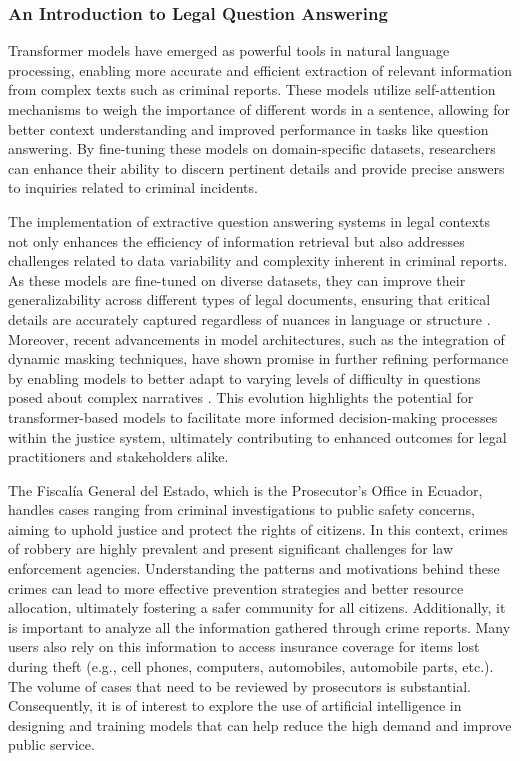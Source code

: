 \documentclass[onecolumn, journal, english, 12pt, a4paper]{IEEEtran} %
\theoremstyle{definition}
\begin{document}
\subsubsection{An Introduction to Legal Question Answering}
\label{sec:an-intr-legal-qa-paper}

Transformer models have emerged as powerful tools in natural language
processing, enabling more accurate and efficient extraction of
relevant information from complex texts such as criminal
reports. These models utilize self-attention mechanisms to weigh the
importance of different words in a sentence, allowing for better
context understanding and improved performance in tasks like question
answering. By fine-tuning these models on domain-specific datasets,
researchers can enhance their ability to discern pertinent details and
provide precise answers to inquiries related to criminal incidents.

The implementation of extractive question answering systems in legal
contexts not only enhances the efficiency of information retrieval but
also addresses challenges related to data variability and complexity
inherent in criminal reports. As these models are fine-tuned on
diverse datasets, they can improve their generalizability across
different types of legal documents, ensuring that critical details are
accurately captured regardless of nuances in language or structure
\cite{jha2022extractive}. Moreover, recent advancements in model
architectures, such as the integration of dynamic masking techniques,
have shown promise in further refining performance by enabling models
to better adapt to varying levels of difficulty in questions posed
about complex narratives \cite{Pearce_Zhan_Komanduri_Zhan_2021}. This
evolution highlights the potential for transformer-based models to
facilitate more informed decision-making processes within the justice
system, ultimately contributing to enhanced outcomes for legal
practitioners and stakeholders alike.

The Fiscalía General del Estado, which is the Prosecutor’s Office in
Ecuador, handles cases ranging from criminal investigations to public
safety concerns, aiming to uphold justice and protect the rights of
citizens. In this context, crimes of robbery are highly prevalent and
present significant challenges for law enforcement
agencies. Understanding the patterns and motivations behind these
crimes can lead to more effective prevention strategies and better
resource allocation, ultimately fostering a safer community for all
citizens. Additionally, it is important to analyze all the information
gathered through crime reports. Many users also rely on this
information to access insurance coverage for items lost during theft
(e.g., cell phones, computers, automobiles, automobile parts,
etc.). The volume of cases that need to be reviewed by prosecutors is
substantial. Consequently, it is of interest to explore the use of
artificial intelligence in designing and training models that can help
reduce the high demand and improve public service.
\end{document}
